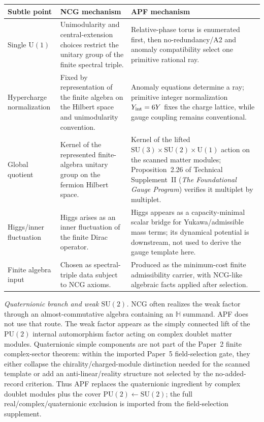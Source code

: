 \documentclass[11pt]{article}
\theoremstyle{definition}
\newcommand{\SU}{\mathrm{SU}}
\newcommand{\U}{\mathrm{U}}
\newcommand{\TSII}{Technical Supplement~II (\emph{The Foundational Gauge Program})}
\begin{document}
\begin{center}\footnotesize
\renewcommand{\arraystretch}{1.12}
\begin{tabular}{@{}p{3.0cm}p{5.2cm}p{5.2cm}@{}}
\toprule
\textbf{Subtle point} & \textbf{NCG mechanism} & \textbf{APF mechanism} \\
\midrule
Single $\U(1)$ & Unimodularity and central-extension choices restrict the unitary group of the finite spectral triple. & Relative-phase torus is enumerated first, then no-redundancy/A2 and anomaly compatibility select one primitive rational ray. \\
Hypercharge normalization & Fixed by representation of the finite algebra on the Hilbert space and unimodularity convention. & Anomaly equations determine a ray; primitive integer normalization $Y_{\rm int}=6Y$ fixes the charge lattice, while gauge coupling remains conventional. \\
Global quotient & Kernel of the represented finite-algebra unitary group on the fermion Hilbert space. & Kernel of the lifted $\SU(3)\times\SU(2)\times\U(1)$ action on the scanned matter modules; Proposition~2.26 of \TSII{} verifies it multiplet by multiplet. \\
Higgs/inner fluctuation & Higgs arises as an inner fluctuation of the finite Dirac operator. & Higgs appears as a capacity-minimal scalar bridge for Yukawa/admissible mass terms; its dynamical potential is downstream, not used to derive the gauge template here. \\
Finite algebra input & Chosen as spectral-triple data subject to NCG axioms. & Produced as the minimum-cost finite admissibility carrier, with NCG-like algebraic facts applied after selection. \\
\bottomrule
\end{tabular}
\end{center}

\smallskip\noindent\textit{Quaternionic branch and weak $\SU(2)$.}\quad
NCG often realizes the weak factor through an almost-commutative algebra
containing an $\mathbb H$ summand.  APF does not use that route.  The weak
factor appears as the simply connected lift of the $\mathrm{PU}(2)$ internal
automorphism factor acting on complex doublet matter modules.  Quaternionic
simple components are not part of the Paper~2 finite complex-sector theorem:
within the imported Paper~5 field-selection gate, they either collapse the
chirality/charged-module distinction needed for the scanned template or add an
anti-linear/reality structure not selected by the no-added-record criterion.
Thus APF replaces the quaternionic ingredient by complex doublet modules plus
the cover $\mathrm{PU}(2)\leftarrow\SU(2)$; the full real/complex/quaternionic
exclusion is imported from the field-selection supplement.
\end{document}
